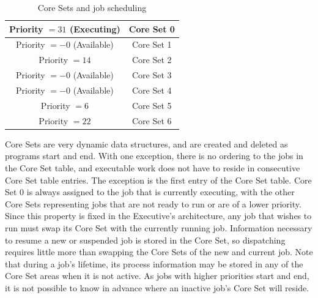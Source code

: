 \documentclass[refcap, oxford]{ahsan}
\begin{document}
\begin{table}[H]
    \begin{center}
        \begin{tabular}{|c|c|}
            \hline
            Priority $=31$ (Executing) & Core Set 0 \\
            \hline
            Priority $=-0$ (Available) & Core Set 1 \\
            \hline
            Priority $=14$ & Core Set 2 \\
            \hline
            Priority $=-0$ (Available) & Core Set 3 \\
            \hline
            Priority $=-0$ (Available) & Core Set 4 \\
            \hline
            Priority $=6$ & Core Set 5 \\
            \hline
            Priority $=22$ & Core Set 6 \\
            \hline
        \end{tabular}
    \end{center}
    \caption{Core Sets and job scheduling}
\end{table}

Core Sets are very dynamic data structures, and are created and deleted as programs start and end. With one exception, there is no ordering to the jobs in the Core Set table, and executable work does not have to reside in consecutive Core Set table entries. The exception is the first entry of the Core Set table. Core Set 0 is always assigned to the job that is currently executing, with the other Core Sets representing jobs that are not ready to run or are of a lower priority. Since this property is fixed in the Executive's architecture, any job that wishes to run must swap its Core Set with the currently running job. Information necessary to resume a new or suspended job is stored in the Core Set, so dispatching requires little more than swapping the Core Sets of the new and current job. Note that during a job's lifetime, its process information may be stored in any of the Core Set areas when it is not active. As jobs with higher priorities start and end, it is not possible to know in advance where an inactive job's Core Set will reside.

\end{document}
